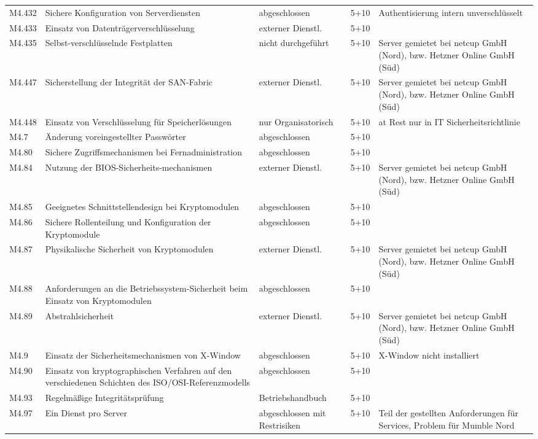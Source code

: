 \begin{longtable}{lp{3.7cm}p{3cm}lp{3.8cm}}
M4.432 & Sichere Konfiguration von Serverdiensten & abgeschlossen & 5+10 & Authentisierung intern unverschlüsselt \\
M4.433 & Einsatz von Datenträgerverschlüsselung & externer Dienstl. & 5+10 &  \\
M4.435 & Selbst-verschlüsselnde Festplatten & nicht durchgeführt & 5+10 & Server gemietet bei netcup GmbH (Nord), bzw. Hetzner Online GmbH (Süd) \\
M4.447 & Sicherstellung der Integrität der SAN-Fabric & externer Dienstl. & 5+10 & Server gemietet bei netcup GmbH (Nord), bzw. Hetzner Online GmbH (Süd) \\
M4.448 & Einsatz von Verschlüsselung für Speicherlösungen & nur Organisatorisch & 5+10 & at Rest nur in IT Sicherheitsrichtlinie \\
M4.7 & Änderung voreingestellter Passwörter & abgeschlossen & 5+10 &  \\
M4.80 & Sichere Zugriffsmechanismen bei Fernadministration & abgeschlossen & 5+10 &  \\
M4.84 & Nutzung der BIOS-Sicherheits-mechanismen & externer Dienstl. & 5+10 & Server gemietet bei netcup GmbH (Nord), bzw. Hetzner Online GmbH (Süd) \\
M4.85 & Geeignetes Schnittstellendesign bei Kryptomodulen & abgeschlossen & 5+10 &  \\
M4.86 & Sichere Rollenteilung und Konfiguration der Kryptomodule & abgeschlossen & 5+10 &  \\
M4.87 & Physikalische Sicherheit von Kryptomodulen & externer Dienstl. & 5+10 & Server gemietet bei netcup GmbH (Nord), bzw. Hetzner Online GmbH (Süd) \\
M4.88 & Anforderungen an die Betriebssystem-Sicherheit beim Einsatz von Kryptomodulen & abgeschlossen & 5+10 &  \\
M4.89 & Abstrahlsicherheit & externer Dienstl. & 5+10 & Server gemietet bei netcup GmbH (Nord), bzw. Hetzner Online GmbH (Süd) \\
M4.9 & Einsatz der Sicherheitsmechanismen von X-Window & abgeschlossen & 5+10 & X-Window nicht installiert \\
M4.90 & Einsatz von kryptographischen Verfahren auf den verschiedenen Schichten des ISO/OSI-Referenzmodells & abgeschlossen & 5+10 &  \\
M4.93 & Regelmäßige Integritätsprüfung & Betriebshandbuch & 5+10 &  \\
M4.97 & Ein Dienst pro Server & abgeschlossen mit Restrisiken & 5+10 & Teil der gestellten Anforderungen für Services, Problem für Mumble Nord \\

\end{longtable}

